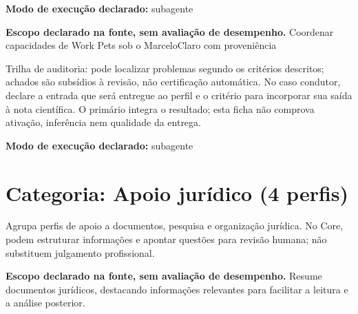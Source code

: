 \begin{arquitetura}
\textbf{Modo de execução declarado:} subagente
\end{arquitetura}


\begin{descricao}
\textbf{Escopo declarado na fonte, sem avaliação de desempenho.}
Coordenar capacidades de Work Pets sob o MarceloClaro com proveniência
\end{descricao}

\begin{funcao}
Trilha de auditoria: pode localizar problemas segundo os critérios descritos; achados são subsídios à revisão, não certificação automática. No caso condutor, declare a entrada que será entregue ao perfil e o critério para incorporar sua saída à nota científica. O primário integra o resultado; esta ficha não comprova ativação, inferência nem qualidade da entrega.
\end{funcao}

\begin{arquitetura}
\textbf{Modo de execução declarado:} subagente
\end{arquitetura}

\clearpage
\section{Categoria: Apoio jurídico (4 perfis)}

\begin{descricao}
Agrupa perfis de apoio a documentos, pesquisa e organização jurídica. No Core, podem estruturar informações e apontar questões para revisão humana; não substituem julgamento profissional.
\end{descricao}


\begin{descricao}
\textbf{Escopo declarado na fonte, sem avaliação de desempenho.}
Resume documentos jurídicos, destacando informações relevantes para facilitar a leitura e a análise posterior.
\end{descricao}


